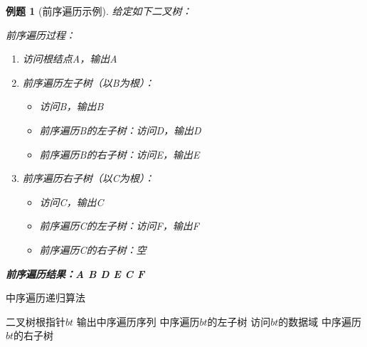 \documentclass[12pt,a4paper]{amsart}
\newtheorem{example}{例题}[section]
\begin{document}
\begin{example}[前序遍历示例]
给定如下二叉树：
\begin{center}
\end{center}

前序遍历过程：
\begin{enumerate}
\item 访问根结点A，输出A
\item 前序遍历左子树（以B为根）：
    \begin{itemize}
    \item 访问B，输出B
    \item 前序遍历B的左子树：访问D，输出D
    \item 前序遍历B的右子树：访问E，输出E
    \end{itemize}
\item 前序遍历右子树（以C为根）：
    \begin{itemize}
    \item 访问C，输出C
    \item 前序遍历C的左子树：访问F，输出F
    \item 前序遍历C的右子树：空
    \end{itemize}
\end{enumerate}

\textbf{前序遍历结果：A B D E C F}
\end{example}

\begin{algorithm}[H]
\caption{中序遍历递归算法}
\begin{algorithmic}[1]
\REQUIRE 二叉树根指针$bt$
\ENSURE 输出中序遍历序列
\STATE 中序遍历$bt$的左子树
\STATE 访问$bt$的数据域
\STATE 中序遍历$bt$的右子树
\ENDIF
\end{algorithmic}
\end{algorithm}
\end{document}
